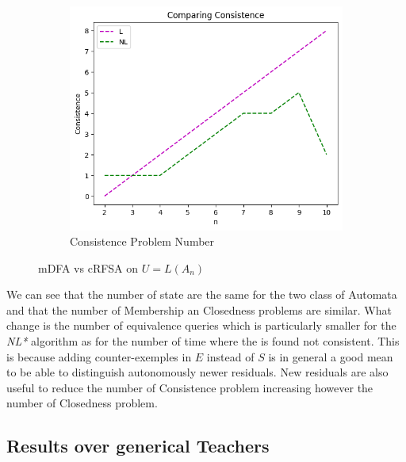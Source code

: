 \begin{figure}[!htb]
\begin{subfigure}[b]{0.3\textwidth}
    \label{fig:ClosednessWrostRFSACompare}
  \end{subfigure}
  \begin{subfigure}[b]{0.3\textwidth}
    \includegraphics[width=\textwidth]{../statistics/plots/wrostRFSA/Consistence.png}
    \caption{Consistence Problem Number}
    \label{fig:ConsistenceWrostRFSACompare}
  \end{subfigure}
  \caption{mDFA vs cRFSA on $U = L(A_n)$}
  \label{fig:wrostRFSA}
\end{figure}

We can see that the number of state are the same for the two class of Automata and that the number of Membership an Closedness problems are similar. What change is the number of equivalence queries which is particularly smaller for the \textit{NL*} algorithm as for the number of time where the \OT is found not consistent. This is because adding counter-exemples in $E$ instead of $S$ is in general a good mean to be able to distinguish autonomously newer residuals. New residuals are also useful to reduce the number of Consistence problem increasing however the number of Closedness problem.

\subsection{Results over generical Teachers}

